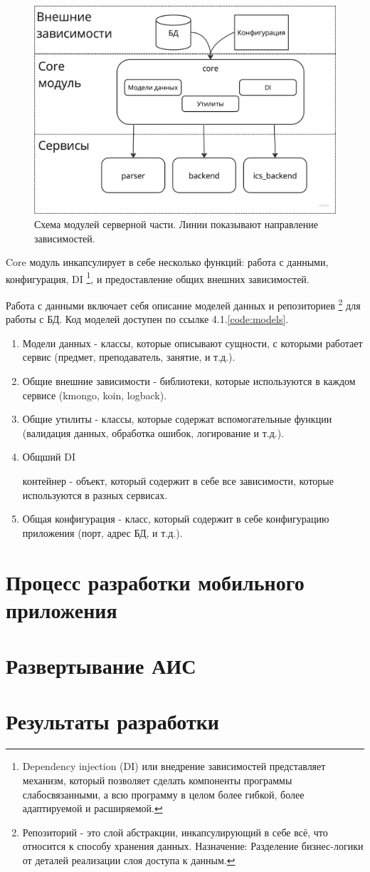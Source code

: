 \begin{figure}
  \centering
  \includegraphics[width=0.8\linewidth]{images/schemes/services.png}
  \caption{Схема модулей серверной части. Линии показывают направление зависимостей.}
  \label{fig:schemes:services}
\end{figure}

Core модуль инкапсулирует в себе несколько функций: работа с данными, конфигурация, DI
\footnote{Dependency injection (DI) или внедрение зависимостей представляет механизм, который позволяет сделать компоненты программы слабосвязанными, 
а всю программу в целом более гибкой, более адаптируемой и расширяемой.
}, и предоставление общих внешних зависимостей.

Работа с данными включает себя описание моделей данных и репозиториев
\footnote{Репозиторий - это слой абстракции, инкапсулирующий в себе всё, что относится к способу хранения данных. 
Назначение: Разделение бизнес-логики от деталей реализации слоя доступа к данным.}
для работы с БД. Код моделей доступен по ссылке 4.1.\ref{code:models}.

\begin{enumerate}
  \item Модели данных - классы, которые описывают сущности, с которыми работает сервис (предмет, преподаватель, занятие, и т.д.).
  \item Общие внешние зависимости - библиотеки, которые используются в каждом сервисе (kmongo, koin, logback).
  \item Общие утилиты - классы, которые содержат вспомогательные функции (валидация данных, обработка ошибок, логирование и т.д.).
  \item Общший DI 

  контейнер - объект, который содержит в себе все зависимости, которые используются в разных сервисах.
  \item Общая конфигурация - класс, который содержит в себе конфигурацию приложения (порт, адрес БД, и т.д.).
\end{enumerate}



\section{Процесс разработки мобильного приложения}

\section{Развертывание АИС}

\section{Результаты разработки}